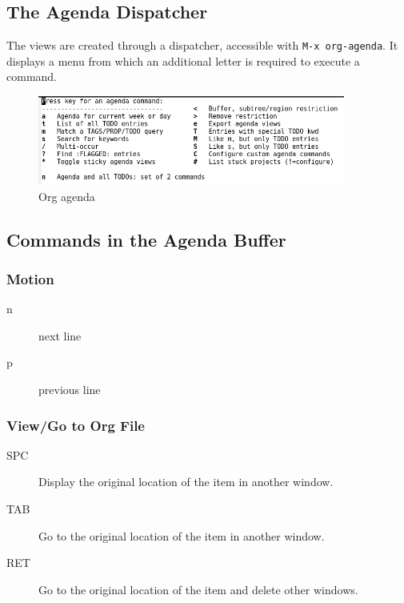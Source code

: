 \subsection{The Agenda Dispatcher}
The views are created through a dispatcher, accessible with \verb|M-x org-agenda|.
It displays a menu from which an additional letter is required to execute a command.

\begin{figure}[!ht]
  \includegraphics[width=0.9\textwidth]{org-agenda.png}
  \caption{Org agenda}
\end{figure}


\subsection{Commands in the Agenda Buffer}
\subsubsection{Motion}
\begin{description}
\item [n] next line
\item [p] previous line
\end{description}

\subsubsection{View/Go to Org File}
\begin{description}
\item [SPC] Display the original location of the item in another window.
\item [TAB] Go to the original location of the item in another window.
\item [RET] Go to the original location of the item and delete other windows.
\end{description}

